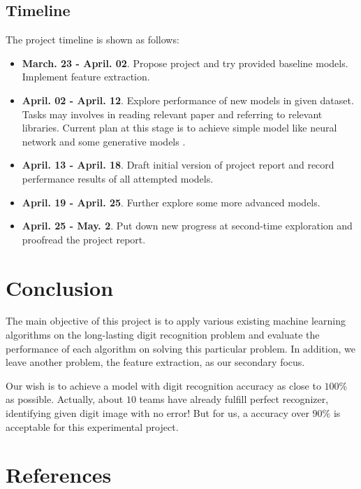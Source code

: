 \documentclass{article} %
\begin{document}
\subsection{Timeline}
The project timeline is shown as follows:
\begin{itemize}
    \item{\textbf{March. 23 - April. 02}. Propose project and try provided
            baseline models. Implement feature extraction.}
    \item{\textbf{April. 02 - April. 12}. Explore performance of new models in
        given dataset. Tasks may involves in reading relevant paper and
        referring to relevant libraries. Current plan at this stage is to
        achieve simple model like neural network and some generative models
        .}
    \item{\textbf{April. 13 - April. 18}. Draft initial version of project report
        and record perfermance results of all attempted models. }
    \item{\textbf{April. 19 - April. 25}. Further explore some more advanced models.}
    \item{\textbf{April. 25 - May. 2}. Put down new progress at second-time
            exploration and proofread the project report.}
\end{itemize}

\section{Conclusion} \label{Conclusion}
    The main objective of this project is to apply various existing machine
    learning algorithms on the long-lasting digit recognition problem and
    evaluate the performance of each algorithm on solving this particular
    problem.
    In addition, we leave another problem, the feature extraction, as our
    secondary focus. 
    
    Our wish is to achieve a model with digit recognition accuracy as close to
    $100\%$ as possible. Actually, about $10$ teams have already fulfill
    perfect recognizer, identifying given digit image with no error!  But for
    us, a accuracy over $90\%$ is acceptable for this experimental project.

\section{References}
\end{document}
